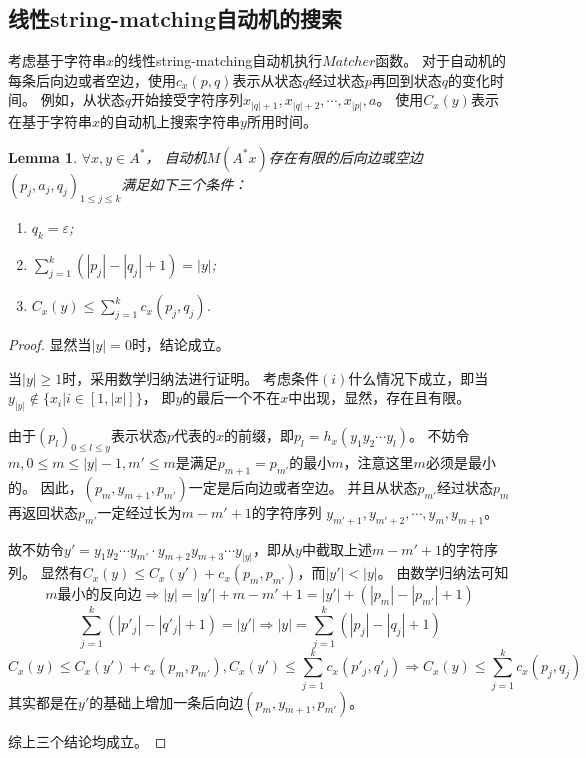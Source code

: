 \documentclass[UTF8]{ctexart}
\newtheorem{lem}[thm]{Lemma}
\theoremstyle{definition}
\theoremstyle{remark}
\numberwithin{equation}{subsection}
\begin{document}
\subsection{线性string-matching自动机的搜索}

	考虑基于字符串$x$的线性string-matching自动机执行$Matcher$函数。
	对于自动机的每条后向边或者空边，使用$c_x(p,q)$表示从状态$q$经过状态$p$再回到状态$q$的变化时间。
	例如，从状态$q$开始接受字符序列$x_{|q|+1}, x_{|q|+2}, \cdots, x_{|p|}, a$。
	使用$C_x(y)$表示在基于字符串$x$的自动机上搜索字符串$y$所用时间。
	
	\begin{lem}
		$\forall x,y \in A^*$，
		自动机$M(A^*x)$存在有限的后向边或空边$(p_j, a_j, q_j)_{1 \le j \le k}$满足如下三个条件：
		\begin{enumerate}[i]
			\item $q_k = \varepsilon$;
			\item $\sum_{j=1}^{k}(|p_j|-|q_j|+1) = |y|$;
			\item $C_x(y) \le \sum_{j=1}^{k} c_x(p_j, q_j)$.
		\end{enumerate}
	\end{lem}
	\begin{proof}
		显然当$|y| = 0$时，结论成立。
		
		当$|y| \ge 1$时，采用数学归纳法进行证明。
		考虑条件$(i)$什么情况下成立，即当$y_|y| \notin \{x_i | i \in [1,|x|]\}$，
		即$y$的最后一个不在$x$中出现，显然，存在且有限。
		
		由于$(p_l)_{0 \le l \le y}$表示状态$p$代表的$x$的前缀，即$p_l = h_x(y_1y_2 \cdots y_l)$。
		不妨令$m, 0 \le m \le |y|-1, m' \le m$是满足$p_{m+1} = p_{m'}$的最小$m$，注意这里$m$必须是最小的。
		因此，$(p_m, y_{m+1}, p_{m'})$一定是后向边或者空边。
		并且从状态$p_{m'}$经过状态$p_{m}$再返回状态$p_{m'}$一定经过长为$m-m'+1$的字符序列
		$y_{m'+1}, y_{m'+2}, \cdots, y_{m}, y_{m+1}$。
		
		故不妨令$y' = y_1y_2 \cdots y_{m'} \cdot y_{m+2} y_{m+3} \cdots y_{|y|}$，即从$y$中截取上述$m-m'+1$的字符序列。
		显然有$C_x(y) \le C_x(y') + c_x(p_{m}, p_{m'})$，而$|y'| < |y|$。
		由数学归纳法可知
		\[
			m\text{最小的反向边} \Rightarrow |y| = |y'| + m - m'+1 = |y'| + (|p_m|-|p_{m'}|+1)	
        \]
        \[
			\sum_{j=1}^{k} (|p'_j|-|q'_j|+1) = |y'| \Rightarrow  |y| = \sum_{j=1}^{k} (|p_j|-|q_j|+1)	
        \]
        \[
			C_x(y) \le C_x(y') + c_x(p_{m}, p_{m'}), C_x(y') \le \sum_{j=1}^{k} c_x(p'_j, q'_j) \Rightarrow C_x(y) \le \sum_{j=1}^{k} c_x(p_j, q_j)
		\]
		其实都是在$y'$的基础上增加一条后向边$(p_m, y_{m+1}, p_{m'})$。

        综上三个结论均成立。
	\end{proof}
	
\end{document}

